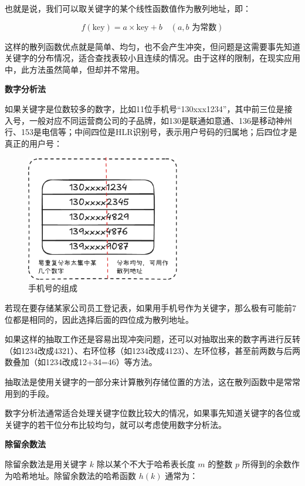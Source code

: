 \documentclass[lang=cn,newtx,10pt,scheme=chinese]{../elegantbook}
\begin{document}
也就是说，我们可以取关键字的某个线性函数值作为散列地址，即：

\[
f(\text{key}) = a \times \text{key} + b \quad (a, b \text{ 为常数})
\]

这样的散列函数优点就是简单、均匀，也不会产生冲突，但问题是这需要事先知道关键字的分布情况，适合查找表较小且连续的情况。由于这样的限制，在现实应用中，此方法虽然简单，但却并不常用。

\textbf{数字分析法}

如果关键字是位数较多的数字，比如11位手机号“130xxx1234”，其中前三位是接入号，一般对应不同运营商公司的子品牌，如130是联通如意通、136是移动神州行、153是电信等；中间四位是HLR识别号，表示用户号码的归属地；后四位才是真正的用户号：

\begin{figure}[h!]
  \centering
  \includegraphics[width=0.6\textwidth]{./figure/pdf/cropped/digital_judge.pdf}
  \caption{手机号的组成}
  \label{fig:phoneNumber}
\end{figure}

若现在要存储某家公司员工登记表，如果用手机号作为关键字，那么极有可能前7位都是相同的，因此选择后面的四位成为散列地址。

如果这样的抽取工作还是容易出现冲突问题，还可以对抽取出来的数字再进行反转（如1234改成4321）、右环位移（如1234改成4123）、左环位移，甚至前两数与后两数叠加（如1234改成12+34=46）等方法。

抽取法是使用关键字的一部分来计算散列存储位置的方法，这在散列函数中是常常用到的手段。

数字分析法通常适合处理关键字位数比较大的情况，如果事先知道关键字的各位或关键字的若干位分布比较均匀，就可以考虑使用数字分析法。

\textbf{除留余数法}

除留余数法是用关键字 $k$ 除以某个不大于哈希表长度 $m$ 的整数 $p$ 所得到的余数作为哈希地址。除留余数法的哈希函数 $h(k)$ 通常为：
\end{document}
